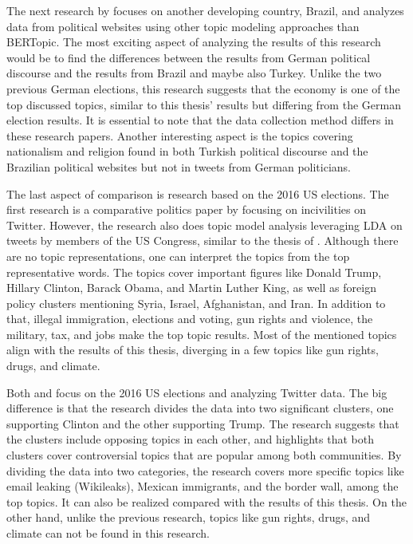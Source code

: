The next research by \textcite{stier_brazil_election_2018} focuses on another developing country, 
Brazil, and analyzes data from political websites using other topic modeling approaches than 
BERTopic. The most exciting aspect of analyzing the results of this research would be to find the 
differences between the results from German political discourse and the results from Brazil and maybe 
also Turkey. Unlike the two previous German elections, this research suggests that the economy is 
one of the top discussed topics, similar to this thesis' results but differing from the German 
election results. It is essential to note that the data collection method differs in these research 
papers. Another interesting aspect is the topics covering nationalism and religion found in 
both Turkish political discourse and the Brazilian political websites but not in tweets from German 
politicians.

The last aspect of comparison is research based on the 2016 US elections. The first research is a 
comparative politics paper by \textcite{theocharis_twitter_political_incivility_2020} focusing on 
incivilities on Twitter. However, the research also does topic model analysis leveraging LDA on tweets
by members of the US Congress, similar to the thesis of 
\textcite{bertopic_twitter_german_politics_2022}. Although there are no topic representations, one 
can interpret the topics from the top representative words. The topics cover important figures like 
Donald Trump, Hillary Clinton, Barack Obama, and Martin Luther King, as well as foreign policy 
clusters mentioning Syria, Israel, Afghanistan, and Iran. In addition to that, illegal immigration, 
elections and voting, gun rights and violence, the military, tax, and jobs make the top topic results. 
Most of the mentioned topics align with the results of this thesis, diverging in a few topics like 
gun rights, drugs, and climate.

Both \textcite{fang_US_elections_2019} and \textcite{fang_US_elections_thesis_2019} focus on the 
2016 US elections and analyzing Twitter data. The big difference is that the research divides the 
data into two significant clusters, one supporting Clinton and the other supporting Trump. The research 
suggests that the clusters include opposing topics in each other, and highlights that both clusters 
cover controversial topics that are popular among both communities. By dividing the data into two 
categories, the research covers more specific topics like email leaking (Wikileaks), Mexican immigrants, 
and the border wall, among the top topics. It can also be realized compared with the results of 
this thesis. On the other hand, unlike the previous research, topics like gun rights, drugs, and 
climate can not be found in this research. 

